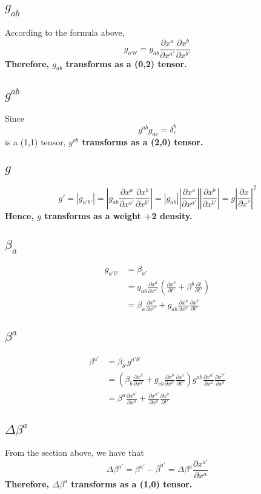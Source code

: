\documentclass{article}
\begin{document}
\subsection{$g_{ab}$}
According to the formula above, 
\[
\boxed{
g_{a'b'} = g_{ab}\frac{\partial x^{a}}{\partial x^{a'}}\frac{\partial x^{b}}{\partial x^{b'}}
}
\]
{\bf {\color{red}Therefore, $g_{ab}$ transforms as a (0,2) tensor.}}
\subsection{$g^{ab}$}
Since
\[
g^{ab}g_{ac} = \delta^{b}_{c}
\]
is a (1,1) tensor, {\bf {\color{red}$g^{ab}$ transforms as a (2,0) tensor. }}
\subsection{$g$}
\[
g' = |g_{a'b'}| = |g_{ab}\frac{\partial x^{a}}{\partial x^{a'}}\frac{\partial x^{b}}{\partial x^{b'}}| = |g_{ab}||\frac{\partial x^{a}}{\partial x^{a'}}||\frac{\partial x^{b}}{\partial x^{b'}}| = g|\frac{\partial x}{\partial x'}|^{2}
\]
{\bf {\color{red}Hence, $g$ transforms as a weight +2 density.}} 
\subsection{$\beta_{a}$}
\begin{align*}
g_{a'0'} & = \beta_{a'}\\
& =  g_{ab}\frac{\partial x^{a}}{\partial x^{a'}}(\frac{\partial x^{b}}{\partial t'} + \beta^{b}\frac{\partial t}{\partial t'})\\
& = \beta_{a}\frac{\partial x^{a}}{\partial x^{a'}} + g_{ab}\frac{\partial x^{a}}{\partial x^{a'}}\frac{\partial x^{b}}{\partial t'}
\end{align*}
\subsection{$\beta^{a}$}
\begin{align*}
\beta^{a'} & = \beta_{b'}g^{a'b'}\\
& = (\beta_{b}\frac{\partial x^{b}}{\partial x^{b'}} + g_{cb}\frac{\partial x^{b}}{\partial x^{b'}}\frac{\partial x^{c}}{\partial t'})g^{ab}\frac{\partial x^{a'}}{\partial x^{a}}\frac{\partial x^{b'}}{\partial x^{b}}\\
& = \beta^{a}\frac{\partial x^{a'}}{\partial x^{a}} + \frac{\partial x^{a'}}{\partial x^{a}}\frac{\partial x^{a}}{\partial t'}
\end{align*}
\subsection{$\Delta \beta^{a}$}
From the section above, we have that
\[
\boxed{
\Delta \beta^{a'} = \beta^{a'} - {\bar \beta}^{a'} = \Delta \beta^{a}\frac{\partial x^{a'}}{\partial x^{a}}
}
\]
{\bf {\color{red}Therefore, $\Delta \beta^{a}$ transforms as a (1,0) tensor.}}
\end{document}
